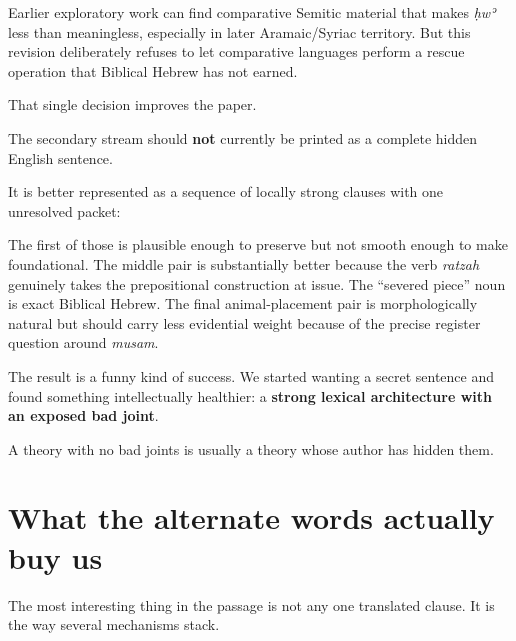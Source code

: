 Earlier exploratory work can find comparative Semitic material that makes \textit{ḥwʾ} less than meaningless, especially in later Aramaic/Syriac territory. But this revision deliberately refuses to let comparative languages perform a rescue operation that Biblical Hebrew has not earned.

That single decision improves the paper.

The secondary stream should \textbf{not} currently be printed as a complete hidden English sentence.

It is better represented as a sequence of locally strong clauses with one unresolved packet:






The first of those is plausible enough to preserve but not smooth enough to make foundational. The middle pair is substantially better because the verb \textit{ratzah} genuinely takes the prepositional construction at issue. The ``severed piece'' noun is exact Biblical Hebrew. The final animal-placement pair is morphologically natural but should carry less evidential weight because of the precise register question around \textit{musam}.\cite{BDB}

The result is a funny kind of success. We started wanting a secret sentence and found something intellectually healthier: a \textbf{strong lexical architecture with an exposed bad joint}.

A theory with no bad joints is usually a theory whose author has hidden them.

\section*{What the alternate words actually buy us}

The most interesting thing in the passage is not any one translated clause. It is the way several mechanisms stack.

